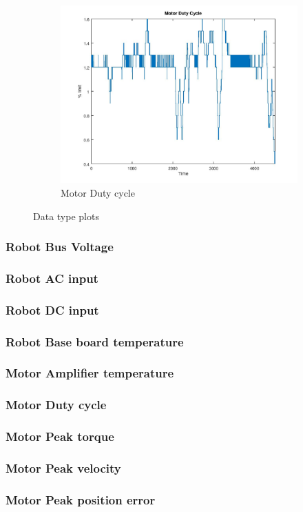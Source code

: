\begin{figure}[ht]
\begin{subfigure}{.5\textwidth}
 \includegraphics[width=.9\linewidth]{Figures/Motor_Duty_Cycle}
 \caption{Motor Duty cycle}
 \label{fig:Motor Duty Cycle}
\end{subfigure}
\caption[Data type plots]{Data type plots}
\label{fig:Data types}
\end{figure}

\subsubsection{Robot Bus Voltage}
\subsubsection{Robot AC input}
\subsubsection{Robot DC input}
\subsubsection{Robot Base board temperature}
\subsubsection{Motor Amplifier temperature}
\subsubsection{Motor Duty cycle}
\subsubsection{Motor Peak torque}
\subsubsection{Motor Peak velocity}
\subsubsection{Motor Peak position error}
